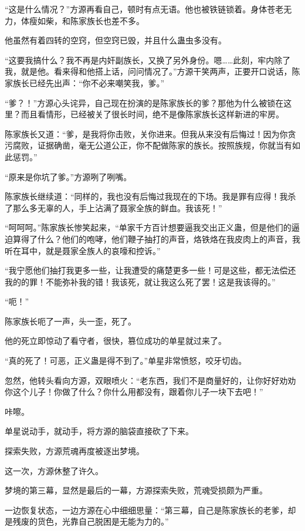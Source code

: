 \begin{this_body}
“这是什么情况？”方源再看自己，顿时有点无语。他也被铁链锁着。身体苍老无力，体瘦如柴，和陈家族长也差不多。

他虽然有着四转的空窍，但空窍已毁，并且什么蛊虫多没有。

“这要我搞什么？我不再是内奸副族长，又换了另外身份。嗯……此刻，牢内除了我，就是他。看来得和他搭上话，问问情况了。”方源干笑两声，正要开口说话，陈家族长已经先出声：“你不必来嘲笑我，爹。”

“爹？！”方源心头诧异，自己现在扮演的是陈家族长的爹？那他为什么被锁在这里？而且看情形，已经被关了很长时间，绝不是像陈家族长这样新进的牢房。

陈家族长又道：“爹，是我将你击败，关你进来。但我从来没有后悔过！因为你贪污腐败，证据确凿，毫无公道公正，你不配做陈家的族长。按照族规，你就当有如此惩罚。”

“原来是你坑了爹。”方源咧了咧嘴。

陈家族长继续道：“同样的，我也没有后悔过我现在的下场。我是罪有应得！我杀了那么多无辜的人，手上沾满了聂家全族的鲜血。我该死！”

“呵呵呵。”陈家族长惨笑起来，“单家千方百计想要逼我交出正义蛊，但是他们的逼迫算得了什么？他们的咆哮，他们鞭子抽打的声音，烙铁烙在我皮肉上的声音，我听在耳中，就是聂家全族人的哀嚎和控诉。”

“我宁愿他们抽打我更多一些，让我遭受的痛楚更多一些！可是这些，都无法偿还我的的罪！不能弥补我的错！我该死，就让我这么死了罢！这是我该得的。”

“呃！”

陈家族长呃了一声，头一歪，死了。

他的死立即惊动了看守者，很快，篡位成功的单星就过来了。

“真的死了！可恶，正义蛊是得不到了。”单星非常愤怒，咬牙切齿。

忽然，他转头看向方源，双眼喷火：“老东西，我们不是商量好的，让你好好劝劝你这个儿子！你做了什么？你什么用都没有，跟着你儿子一块下去吧！”

咔嚓。

单星说动手，就动手，将方源的脑袋直接砍了下来。

探索失败，方源荒魂再度被逐出梦境。

这一次，方源休整了许久。

梦境的第三幕，显然是最后的一幕，方源探索失败，荒魂受损颇为严重。

一边恢复状态，一边方源在心中细细思量：“第三幕，自己是陈家族长的老爹，却是残废的货色，光靠自己脱困是无能为力的。”


\end{this_body}
